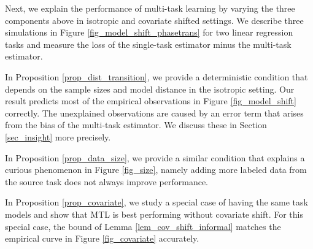 Next, we explain the performance of multi-task learning by varying the three components above in isotropic and covariate shifted settings.
We describe three simulations in Figure \ref{fig_model_shift_phasetrans} for two linear regression tasks and measure the loss of the single-task estimator minus the multi-task estimator.
\squishlist
	\item In Proposition \ref{prop_dist_transition}, we provide a deterministic condition that depends on the sample sizes and model distance in the isotropic setting.
	Our result predicts most of the empirical observations in Figure \ref{fig_model_shift} correctly.
	The unexplained observations are caused by an error term that arises from the bias of the multi-task estimator.
	We discuss these in Section \ref{sec_insight} more precisely.
	\item In Proposition \ref{prop_data_size}, we provide a similar condition that explains a curious phenomenon in Figure \ref{fig_size}, namely adding more labeled data from the source task does not always improve performance.
	\item In Proposition \ref{prop_covariate}, we study a special case of having the same task models and show that MTL is best performing without covariate shift.
	For this special case, the bound of Lemma \ref{lem_cov_shift_informal} matches the empirical curve in Figure \ref{fig_covariate} accurately.
\squishend
